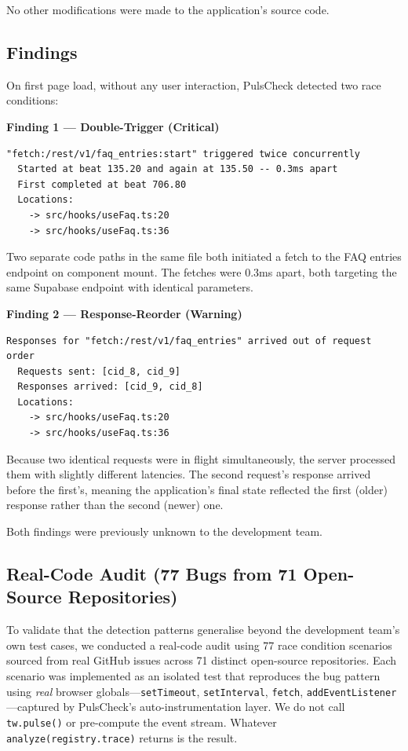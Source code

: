 \documentclass[11pt,a4paper]{article}
\begin{document}
No other modifications were made to the application's source code.

\subsection{Findings}

On first page load, without any user interaction, PulsCheck detected two race conditions:

\textbf{Finding 1 --- Double-Trigger (Critical)}

\begin{lstlisting}
"fetch:/rest/v1/faq_entries:start" triggered twice concurrently
  Started at beat 135.20 and again at 135.50 -- 0.3ms apart
  First completed at beat 706.80
  Locations:
    -> src/hooks/useFaq.ts:20
    -> src/hooks/useFaq.ts:36
\end{lstlisting}

Two separate code paths in the same file both initiated a fetch to the FAQ entries endpoint on component mount. The fetches were 0.3ms apart, both targeting the same Supabase endpoint with identical parameters.

\textbf{Finding 2 --- Response-Reorder (Warning)}

\begin{lstlisting}
Responses for "fetch:/rest/v1/faq_entries" arrived out of request order
  Requests sent: [cid_8, cid_9]
  Responses arrived: [cid_9, cid_8]
  Locations:
    -> src/hooks/useFaq.ts:20
    -> src/hooks/useFaq.ts:36
\end{lstlisting}

Because two identical requests were in flight simultaneously, the server processed them with slightly different latencies. The second request's response arrived before the first's, meaning the application's final state reflected the first (older) response rather than the second (newer) one.

Both findings were previously unknown to the development team.

\subsection{Real-Code Audit (77 Bugs from 71 Open-Source Repositories)}

To validate that the detection patterns generalise beyond the development team's own test cases, we conducted a real-code audit using 77 race condition scenarios sourced from real GitHub issues across 71 distinct open-source repositories. Each scenario was implemented as an isolated test that reproduces the bug pattern using \emph{real} browser globals---\texttt{setTimeout}, \texttt{setInterval}, \texttt{fetch}, \texttt{addEventListener}---captured by PulsCheck's auto-instrumentation layer. We do not call \texttt{tw.pulse()} or pre-compute the event stream. Whatever \texttt{analyze(registry.trace)} returns is the result.
\end{document}
